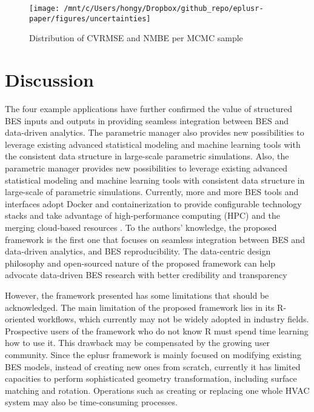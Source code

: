 \documentclass[3p, times]{elsarticle} %
\begin{document}
\begin{figure}[!htb]
\texttt{[image: /mnt/c/Users/hongy/Dropbox/github\_repo/eplusr-paper/figures/uncertainties]} \caption{Distribution of CVRMSE and NMBE per MCMC sample}\label{fig:uncertainties}
\end{figure}

\hypertarget{discussion}{%
\section{Discussion}\label{discussion}}

The four example applications have further confirmed the value of structured
BES inputs and outputs in providing seamless integration between BES and
data-driven analytics. The parametric manager also provides new possibilities
to leverage existing advanced statistical modeling and machine learning tools
with the consistent data structure in large-scale parametric simulations.
Also, the parametric manager provides new possibilities to leverage existing
advanced statistical modeling and machine learning tools with consistent data
structure in large-scale of parametric simulations.
Currently, more and more BES tools and interfaces adopt Docker and
containerization to provide configurable technology stacks and take advantage
of high-performance computing (HPC) and the merging cloud-based resources
\citep{Ball2020open, Karaguzel2019Open}.
To the authors' knowledge, the proposed framework is the first one
that focuses on seamless integration between BES and data-driven analytics, and
BES reproducibility.
The data-centric design philosophy and open-sourced nature of the proposed framework can help advocate data-driven BES research with better credibility and transparency

However, the framework presented has some limitations that should be acknowledged.
The main limitation of the proposed framework lies in its R-oriented workflows,
which currently may not be widely adopted in industry fields. Prospective users
of the framework who do not know R must spend time learning how to use it. This
drawback may be compensated by the growing user community. Since the eplusr
framework is mainly focused on modifying existing BES models, instead of
creating new ones from scratch, currently it has limited capacities to perform
sophisticated geometry transformation, including surface matching and rotation.
Operations such as creating or replacing one whole HVAC system may also be
time-consuming processes.
\end{document}
